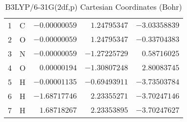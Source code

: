 \documentclass[10pt,oneside]{article}
\begin{document}
\begin{table}[h]
\centering
\caption{B3LYP/6-31G(2df,p) Cartesian Coordinates (Bohr)}
\begin{tabular}{llrrr}
\toprule
1  & C  & $-0.00000059$ & $ 1.24795347$ & $-3.03358839$ \\
2  & O  & $-0.00000059$ & $ 1.24795347$ & $-0.33704383$ \\
3  & N  & $-0.00000059$ & $-1.27225729$ & $ 0.58716025$ \\
4  & O  & $ 0.00000194$ & $-1.30807248$ & $ 2.80083745$ \\
5  & H  & $-0.00001135$ & $-0.69493911$ & $-3.73503784$ \\
6  & H  & $-1.68717746$ & $ 2.23355271$ & $-3.70247146$ \\
7  & H  & $ 1.68718267$ & $ 2.23353895$ & $-3.70247627$ \\
\bottomrule
\end{tabular}
\end{table}
\end{document}
